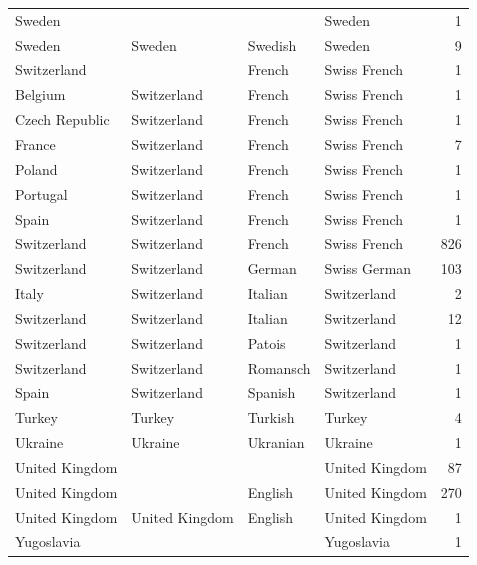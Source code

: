 \documentclass{article}
\begin{document}
\begin{table}[!htp]
\begin{center}
\begin{tabular}{|l|l|l||l|r|}
          Sweden &                &                  &         Sweden &    1 \\
          Sweden &         Sweden &          Swedish &         Sweden &    9 \\
     Switzerland &                &           French &   Swiss French &    1 \\
         Belgium &    Switzerland &           French &   Swiss French &    1 \\
  Czech Republic &    Switzerland &           French &   Swiss French &    1 \\
          France &    Switzerland &           French &   Swiss French &    7 \\
          Poland &    Switzerland &           French &   Swiss French &    1 \\
        Portugal &    Switzerland &           French &   Swiss French &    1 \\
           Spain &    Switzerland &           French &   Swiss French &    1 \\
     Switzerland &    Switzerland &           French &   Swiss French &  826 \\
     Switzerland &    Switzerland &           German &   Swiss German &  103 \\
           Italy &    Switzerland &          Italian &    Switzerland &    2 \\
     Switzerland &    Switzerland &          Italian &    Switzerland &   12 \\
     Switzerland &    Switzerland &           Patois &    Switzerland &    1 \\
     Switzerland &    Switzerland &         Romansch &    Switzerland &    1 \\
           Spain &    Switzerland &          Spanish &    Switzerland &    1 \\
          Turkey &         Turkey &          Turkish &         Turkey &    4 \\
         Ukraine &        Ukraine &         Ukranian &        Ukraine &    1 \\
  United Kingdom &                &                  & United Kingdom &   87 \\
  United Kingdom &                &          English & United Kingdom &  270 \\
  United Kingdom & United Kingdom &          English & United Kingdom &    1 \\
      Yugoslavia &                &                  &     Yugoslavia &    1 \\

\end{tabular}
\end{center}
\end{table}
\end{document}
